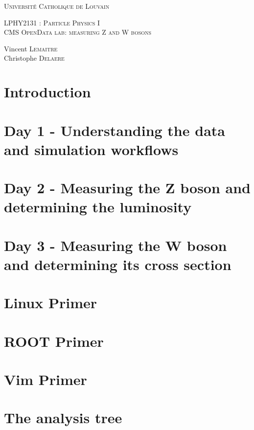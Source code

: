 \documentclass[a4paper]{scrartcl}
\begin{document}
\def\w{\par \vspace{\baselineskip}}
\begin{titlepage}
\begin{center}
\textsc{\Large Université Catholique de Louvain }\\[0.5cm]
\w
\w
\textsc{\huge LPHY2131 : Particle Physics I }\\[0.34cm]
\textsc{\large CMS OpenData lab: measuring Z and W bosons}\\[0.7cm]
\w
\begin{minipage}{0.6\textwidth}
\begin{center}
\large
Vincent \textsc{Lemaitre}\\
Christophe \textsc{Delaere}\\
\end{center}
\end{minipage} 
\end{center}
\end{titlepage}

\tableofcontents
\newpage

\section{Introduction}

\newpage

\section{Day 1 - Understanding the data and simulation workflows}

\newpage

\section{Day 2 - Measuring the Z boson and determining the luminosity}

\newpage

\section{Day 3 - Measuring the W boson and determining its cross section}

\newpage

\section{Linux Primer}

\newpage

\section{ROOT Primer}

\newpage

\section{Vim Primer}

\newpage

\section{The analysis tree}

\newpage
\end{document}
